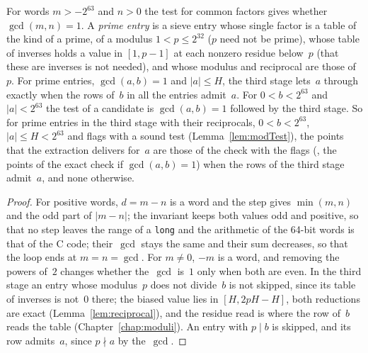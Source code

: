\begin{lemma}\label{lem:candidate}
  \leanok
  For words $m > -2^{63}$ and $n > 0$ the test for common factors gives whether $\gcd(m, n) = 1$. A
  \emph{prime entry} is a sieve entry whose single factor is a table of the kind of a prime, of a
  modulus $1 < p \le 2^{32}$ ($p$ need not be prime), whose table of inverses holds a value in
  $[1, p - 1]$ at each nonzero residue below~$p$ (that these are inverses is not needed), and whose
  modulus and reciprocal are those of~$p$. For prime entries, $\gcd(a, b) = 1$ and $|a| \le H$, the
  third stage lets~$a$ through exactly when the rows of~$b$ in all the entries admit~$a$. For
  $0 < b < 2^{63}$ and $|a| < 2^{63}$ the test of a candidate is $\gcd(a, b) = 1$ followed by the
  third stage. So for prime entries in the third stage with their reciprocals, $0 < b < 2^{63}$,
  $|a| \le H < 2^{63}$ and flags with a sound test (Lemma~\ref{lem:modTest}), the points that the
  extraction delivers for~$a$ are those of the check with the flags
  (, the points of the exact check if $\gcd(a, b) = 1$) when the
  rows of the third stage admit~$a$, and none otherwise.
\end{lemma}

\begin{proof}
  \leanok
  For positive words, $d = m - n$ is a word and the step gives $\min(m, n)$ and the odd part of
  $|m - n|$; the invariant keeps both values odd and positive, so that no step leaves the range of
  a \verb|long| and the arithmetic of the 64-bit words is that of the C code; their~$\gcd$ stays
  the same and their sum decreases, so that the loop ends at $m = n = \gcd$. For $m \ne 0$, $-m$ is
  a word, and removing the powers of~$2$ changes whether the~$\gcd$ is~$1$ only when both are even.
  In the third stage an entry whose modulus~$p$ does not divide~$b$ is not skipped, since its table
  of inverses is not~$0$ there; the biased value lies in $[H, 2pH - H]$, both reductions are exact
  (Lemma~\ref{lem:reciprocal}), and the residue read is where the row of~$b$ reads the table
  (Chapter~\ref{chap:moduli}). An entry with $p \mid b$ is skipped, and its row admits~$a$, since
  $p \nmid a$ by the~$\gcd$.
\end{proof}

